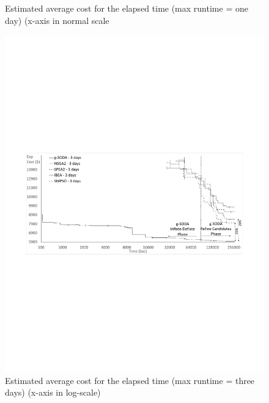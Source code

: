 \documentclass[a4paper, 12pt]{article} %
\begin{document}
\begin{figure}[h!]
\begin{minipage}{.5\textwidth}
\begin{center}
			\caption{Estimated average cost for the elapsed time (max runtime = one day) (x-axis in normal scale}
			\label{fig:GraphsForTime_24hours}       %
		\end{center}
	\end{minipage}
	\hfill
	\begin{minipage}{.5\textwidth}
		\begin{center}
			\includegraphics[width=\textwidth]{images/sodavsjmetal3day.pdf}
			\caption{Estimated average cost for the elapsed time (max runtime = three days) (x-axis in log-scale)}
			\label{fig:GraphsForTime_3days}       %
		\end{center}
	\end{minipage}
\end{figure}

\end{document}
